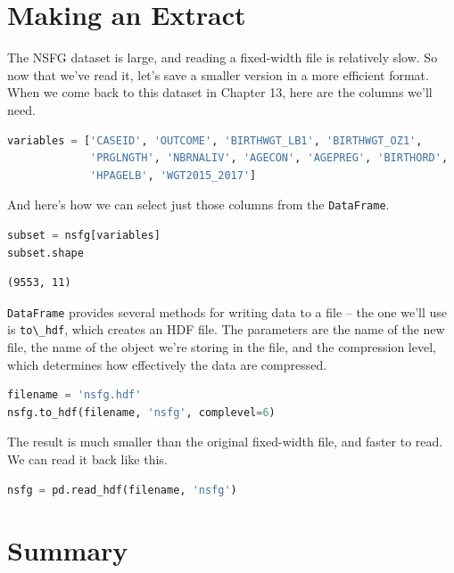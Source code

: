 \section{Making an Extract}\label{making-an-extract}

The NSFG dataset is large, and reading a fixed-width file is relatively
slow. So now that we've read it, let's save a smaller version in a more
efficient format. When we come back to this dataset in Chapter 13, here
are the columns we'll need.

\begin{lstlisting}[language=Python,style=source]
variables = ['CASEID', 'OUTCOME', 'BIRTHWGT_LB1', 'BIRTHWGT_OZ1',
             'PRGLNGTH', 'NBRNALIV', 'AGECON', 'AGEPREG', 'BIRTHORD',
             'HPAGELB', 'WGT2015_2017']
\end{lstlisting}

And here's how we can select just those columns from the
\passthrough{\lstinline!DataFrame!}.

\begin{lstlisting}[language=Python,style=source]
subset = nsfg[variables]
subset.shape
\end{lstlisting}

\begin{lstlisting}[style=output]
(9553, 11)
\end{lstlisting}

\passthrough{\lstinline!DataFrame!} provides several methods for writing
data to a file -- the one we'll use is
\passthrough{\lstinline!to\_hdf!}, which creates an HDF file. The
parameters are the name of the new file, the name of the object we're
storing in the file, and the compression level, which determines how
effectively the data are compressed.

\begin{lstlisting}[language=Python,style=source]
filename = 'nsfg.hdf'
nsfg.to_hdf(filename, 'nsfg', complevel=6)
\end{lstlisting}

The result is much smaller than the original fixed-width file, and
faster to read. We can read it back like this.

\begin{lstlisting}[language=Python,style=source]
nsfg = pd.read_hdf(filename, 'nsfg')
\end{lstlisting}

\section{Summary}\label{summary}

